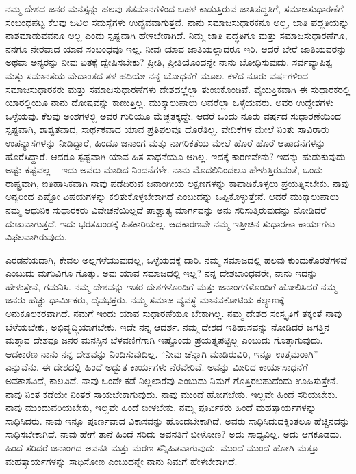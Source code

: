 ನಮ್ಮ ದೇಶದ ಜನರ ಮನಸ್ಸನ್ನು ಹಲವು ಶತಮಾನಗಳಿಂದ ಬಹಳ ಕಾಡುತ್ತಿರುವ ಜಾತಿಪದ್ಧತಿಗೆ, ಸಮಾಜಸುಧಾರಣೆಗೆ ಸಂಬಂಧಪಟ್ಟ ಕೆಲವು ಜಟಿಲ ಸಮಸ್ಯೆಗಳು ಉದ್ಭವವಾಗುತ್ತವೆ. ನಾನು ಸಮಾಜಸುಧಾರಕನೂ ಅಲ್ಲ, ಜಾತಿ ಪದ್ಧತಿಯನ್ನು ನಾಶಮಾಡುವವನೂ ಅಲ್ಲ ಎಂದು ಸ್ಪಷ್ಟವಾಗಿ ಹೇಳಬೇಕಾಗಿದೆ. ನಿಮ್ಮ ಜಾತಿ ಪದ್ಧತಿಗೂ ಮತ್ತು ಸಮಾಜಸುಧಾರಣೆಗೂ, ನನಗೂ ನೇರವಾದ ಯಾವ ಸಂಬಂಧವೂ ಇಲ್ಲ. ನೀವು ಯಾವ ಜಾತಿಯಲ್ಲಾದರೂ ಇರಿ. ಆದರೆ ಬೇರೆ ಜಾತಿಯವರನ್ನು ಅಥವಾ ಅನ್ಯರನ್ನು ನೀವು ಏತಕ್ಕೆ ದ್ವೇಷಿಸಬೇಕು? ಪ್ರೀತಿ, ಪ್ರೀತಿಯೊಂದನ್ನೇ ನಾನು ಬೋಧಿಸುವುದು. ಸರ್ವವ್ಯಾಪಿತ್ವ ಮತ್ತು ಸಮಾನತೆಯ ವೇದಾಂತದ ತಳ ಹದಿಯೇ ನನ್ನ ಬೋಧನೆಗೆ ಮೂಲ. ಕಳೆದ ನೂರು ವರ್ಷಗಳಿಂದ ಸಮಾಜಸುಧಾರಕರು ಮತ್ತು ಸಮಾಜಸುಧಾರಣೆಗಳು ದೇಶದಲ್ಲೆಲ್ಲಾ ತುಂಬಿಕೊಂಡಿವೆ. ವೈಯಕ್ತಿಕವಾಗಿ ಈ ಸುಧಾರಕರಲ್ಲಿ ಯಾರಲ್ಲಿಯೂ ನಾನು ದೋಷವನ್ನು ಕಾಣುತ್ತಿಲ್ಲ. ಮುಕ್ಕಾಲುಪಾಲು ಅವರೆಲ್ಲಾ ಒಳ್ಳೆಯವರು. ಅವರ ಉದ್ದೇಶಗಳು ಒಳ್ಳೆಯವು. ಕೆಲವು ಅಂಶಗಳಲ್ಲಿ ಅವರ ಗುರಿಯೂ ಮೆಚ್ಚತಕ್ಕದ್ದೇ. ಆದರೆ ಒಂದು ನೂರು ವರ್ಷದ ಸುಧಾರಣೆಯಿಂದ ಸ್ಪಷ್ಟವಾಗಿ, ಶಾಶ್ವತವಾದ, ಸಾರ್ಥಕವಾದ ಯಾವ ಪ್ರತಿಫಲವೂ ದೊರೆತಿಲ್ಲ. ವೇದಿಕೆಗಳ ಮೇಲೆ ನಿಂತು ಸಾವಿರಾರು ಉಪನ್ಯಾಸಗಳನ್ನು ನೀಡಿದ್ದಾರೆ, ಹಿಂದೂ ಜನಾಂಗ ಮತ್ತು ನಾಗರಿಕತೆಯ ಮೇಲೆ ಹೊರೆ ಹೊರೆ ಆಪಾದನೆಗಳನ್ನು ಹೊರೆಸಿದ್ದಾರೆ. ಆದರೂ ಸ್ಪಷ್ಟವಾಗಿ ಯಾವ ಹಿತ ಸಾಧನೆಯೂ ಆಗಿಲ್ಲ. ಇದಕ್ಕೆ ಕಾರಣವೇನು? ಇದನ್ನು ಹುಡುಕುವುದು ಅಷ್ಟು ಕಷ್ಟವಲ್ಲ – ಇದು ಅವರು ಮಾಡಿದ ನಿಂದನೆಗಳೇ. ನಾನು ಮೊದಲಿನಿಂದಲೂ ಹೇಳುತ್ತಿರುವಂತೆ, ಒಂದು ರಾಷ್ಟ್ರವಾಗಿ, ಐತಿಹಾಸಿಕವಾಗಿ ನಾವು ಪಡೆದಿರುವ ಜನಾಂಗೀಯ ಲಕ್ಷಣಗಳನ್ನು ಕಾಪಾಡಿಕೊಳ್ಳಲು ಪ್ರಯತ್ನಿಸಬೇಕು. ನಾವು ಅನ್ಯರಿಂದ ಎಷ್ಟೋ ವಿಷಯಗಳನ್ನು ಕಲಿತುಕೊಳ್ಳಬೇಕಾಗಿದೆ ಎಂಬುದನ್ನು ಒಪ್ಪಿಕೊಳ್ಳುತ್ತೇನೆ. ಆದರೆ ಮುಕ್ಕಾಲುಪಾಲು ನಮ್ಮ ಆಧುನಿಕ ಸುಧಾರಕರು ವಿವೇಚನೆಯಿಲ್ಲದೆ ಪಾಶ್ಚಾತ್ಯ ಮಾರ್ಗವನ್ನು ಅನು ಸರಿಸುತ್ತಿರುವುದನ್ನು ನೋಡಿದರೆ ದುಃಖವಾಗುತ್ತದೆ. ಇದು ಭರತಖಂಡಕ್ಕೆ ಹಿತಕಾರಿಯಲ್ಲ. ಆದಕಾರಣವೇ ನಮ್ಮ ಇತ್ತೀಚಿನ ಸುಧಾರಣಾ ಕಾರ್ಯಗಳು ವಿಫಲವಾಗಿರುವುದು. 

ಎರಡನೆಯದಾಗಿ, ಕೇವಲ ಅಲ್ಲಗಳೆಯುವುದಲ್ಲ, ಒಳ್ಳೆಯದಕ್ಕೆ ದಾರಿ. ನಮ್ಮ ಸಮಾಜದಲ್ಲಿ ಹಲವು ಕುಂದುಕೊರತೆಗಳಿವೆ ಎಂಬುದು ಮಗುವಿಗೂ ಗೊತ್ತು. ಅವು ಯಾವ ಸಮಾಜದಲ್ಲಿ ಇಲ್ಲ? ನನ್ನ ದೇಶಬಾಂಧವರೇ, ನಾನು ಇದನ್ನು ಹೇಳುತ್ತೇನೆ, ಗಮನಿಸಿ. ನಮ್ಮ ದೇಶವನ್ನು ಇತರ ದೇಶಗಳೊಂದಿಗೆ ಮತ್ತು ಜನಾಂಗಗಳೊಂದಿಗೆ ಹೋಲಿಸಿದರೆ ನಮ್ಮ ಜನರು ಹೆಚ್ಚು ಧಾರ್ಮಿಕರು, ದೈವಭಕ್ತರು. ನಮ್ಮ ಸಮಾಜ ವ್ಯವಸ್ಥೆ ಮಾನವಕೋಟಿಯ ಕಲ್ಯಾಣಕ್ಕೆ ಅನುಕೂಲಕರವಾಗಿದೆ. ನಮಗೆ ಇಂದು ಯಾವ ಸುಧಾರಣೆಯೂ ಬೇಕಾಗಿಲ್ಲ. ನಮ್ಮ ದೇಶದ ಸಂಸ್ಕೃತಿಗೆ ತಕ್ಕಂತೆ ನಾವು ಬೆಳೆಯಬೇಕು, ಅಭಿವೃದ್ಧಿಯಾಗಬೇಕು. ಇದೇ ನನ್ನ ಆದರ್ಶ. ನಮ್ಮ ದೇಶದ ಇತಿಹಾಸವನ್ನು ನೋಡಿದರೆ ಜಗತ್ತಿನ ಮತ್ತಾವ ದೇಶವೂ ಜನರ ಮನಸ್ಸಿನ ಬೆಳವಣಿಗೆಗಾಗಿ ಇಷ್ಟೊಂದು ಪ್ರಯತ್ನಪಟ್ಟಿಲ್ಲ ಎಂಬುದು ಗೊತ್ತಾಗುವುದು. ಆದಕಾರಣ ನಾನು ನನ್ನ ದೇಶವನ್ನು ನಿಂದಿಸುವುದಿಲ್ಲ. “ನೀವು ಚೆನ್ನಾಗಿ ಮಾಡಿರುವಿರಿ, ಇನ್ನೂ ಉತ್ತಮರಾಗಿ” ಎನ್ನುವೆನು. ಈ ದೇಶದಲ್ಲಿ ಹಿಂದೆ ಅದ್ಭುತ ಕಾರ್ಯಗಳು ನೆರವೇರಿವೆ. ಅವನ್ನು ಮೀರಿದ ಕಾರ್ಯಸಾಧನೆಗೆ ಅವಕಾಶವಿದೆ, ಕಾಲವಿದೆ. ನಾವು ಒಂದೇ ಕಡೆ ನಿಲ್ಲಲಾರೆವು ಎಂಬುದು ನಿಮಗೆ ಗೊತ್ತಿರಬಹುದೆಂದು ಊಹಿಸುತ್ತೇನೆ. ನಾವು ನಿಂತ ಕಡೆಯೇ ನಿಂತರೆ ಸಾಯಬೇಕಾಗುವುದು. ನಾವು ಮುಂದೆ ಹೋಗಬೇಕು. ಇಲ್ಲವೇ ಹಿಂದೆ ಸರಿಯಬೇಕು. ನಾವು ಮುಂದುವರಿಯಬೇಕು, ಇಲ್ಲವೇ ಹಿಂದೆ ಬೀಳಬೇಕು. ನಮ್ಮ ಪೂರ್ವಿಕರು ಹಿಂದೆ ಮಹತ್ಕಾರ್ಯಗಳನ್ನು ಸಾಧಿಸಿದರು. ನಾವು ಇನ್ನೂ ಪೂರ್ಣವಾದ ವಿಕಾಸವನ್ನು ಹೊಂದಬೇಕಾಗಿದೆ. ಅವರು ಸಾಧಿಸಿದುದಕ್ಕಿಂತಲೂ ಹೆಚ್ಚಿನದನ್ನು ಸಾಧಿಸಬೇಕಾಗಿದೆ. ನಾವು ಹೇಗೆ ತಾನೆ ಹಿಂದೆ ಸರಿದು ಅವನತಿಗೆ ಬೀಳೋಣ? ಅದು ಸಾಧ್ಯವಿಲ್ಲ. ಅದು ಆಗಕೂಡದು. ಹಿಂದೆ ಸರಿದರೆ ಜನಾಂಗದ ಅವನತಿ ಮತ್ತು ಮರಣ ಸನ್ನಿಹಿತವಾಗುವುದು. ಮುಂದೆ ಮುಂದೆ ಹೋಗಿ ಮತ್ತೂ ಮಹತ್ಕಾರ್ಯಗಳನ್ನು ಸಾಧಿಸೋಣ ಎಂಬುದನ್ನೇ ನಾನು ನಿಮಗೆ ಹೇಳಬೇಕಾಗಿದೆ. 

